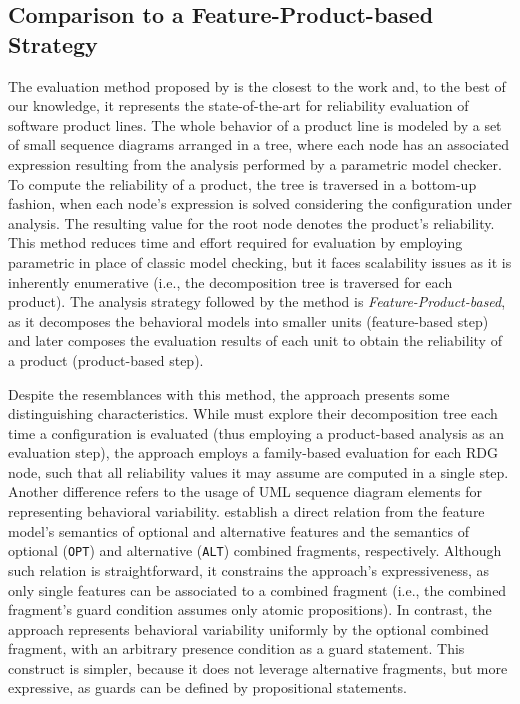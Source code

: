 \subsection{Comparison to a Feature-Product-based Strategy}
 \label{subsec:ghezzi}

The evaluation method proposed by \citet{ghezzi_model-based_2013} is the closest
to the work and, to the best of our knowledge, it represents the
state-of-the-art for reliability evaluation of software product lines. The whole
behavior of a product line is modeled by a set of small sequence diagrams
arranged in a tree, where each node has an associated expression resulting from
the analysis performed by a parametric model checker. To compute the reliability
of a product, the tree is traversed in a bottom-up fashion, when each node's
expression is solved considering the configuration under analysis.  The
resulting value for the root node denotes the product's reliability. This method
reduces time and effort required for evaluation by employing parametric in place
of classic model checking, but it faces scalability issues as it is inherently
enumerative (i.e., the decomposition tree is traversed for each product). The
analysis strategy followed by the method is \emph{Feature-Product-based}, as it
decomposes the behavioral models into smaller units (feature-based step) and
later composes the evaluation results of each unit to obtain the reliability of
a product (product-based step).


Despite the resemblances with this method, the approach presents some
distinguishing characteristics. While \citet{ghezzi_model-based_2013} must
explore their decomposition tree each time a configuration is evaluated (thus
employing a product-based analysis as an evaluation step), the approach employs
a family-based evaluation for each RDG node, such that all reliability values it
may assume are computed in a single step.  Another difference refers to the
usage of UML sequence diagram elements for representing behavioral variability.
\citet{ghezzi_model-based_2013} establish a direct relation from the feature
model's semantics of optional and alternative features and the semantics of
optional (\texttt{OPT}) and alternative (\texttt{ALT}) combined fragments,
respectively.  Although such relation is straightforward, it constrains the
approach's expressiveness, as only single features can be associated to a
combined fragment (i.e., the combined fragment's guard condition assumes only
atomic propositions).  In contrast, the approach represents behavioral
variability uniformly by the optional combined fragment, with an arbitrary
presence condition as a guard statement.  This construct is simpler, because it
does not leverage alternative fragments, but more expressive, as guards can be
defined by propositional statements.


